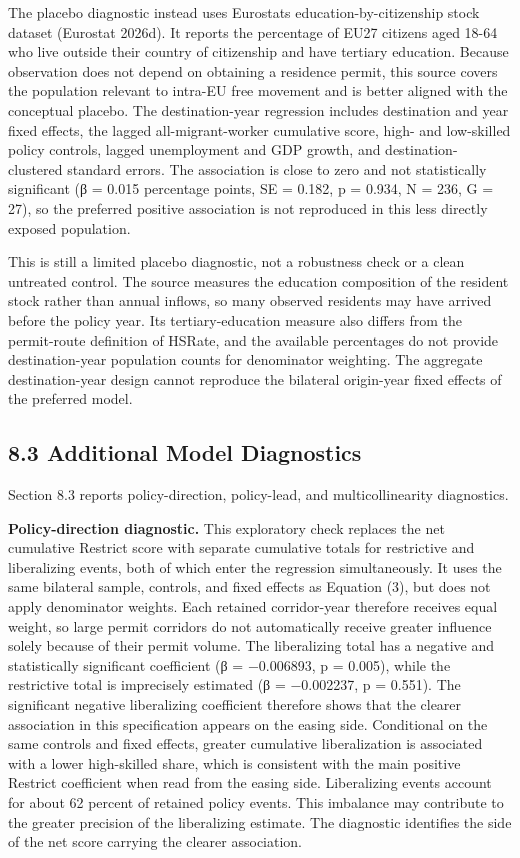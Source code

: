 \documentclass[11pt,a4paper]{article}
\begin{document}
The placebo diagnostic instead uses Eurostat\textquotesingle s
education-by-citizenship stock dataset (Eurostat 2026d). It reports the
percentage of EU27 citizens aged 18-64 who live outside their country of
citizenship and have tertiary education. Because observation does not
depend on obtaining a residence permit, this source covers the
population relevant to intra-EU free movement and is better aligned with
the conceptual placebo. The destination-year regression includes
destination and year fixed effects, the lagged all-migrant-worker
cumulative score, high- and low-skilled policy controls, lagged
unemployment and GDP growth, and destination-clustered standard errors.
The association is close to zero and not statistically significant (β =
0.015 percentage points, SE = 0.182, p = 0.934, N = 236, G = 27), so the
preferred positive association is not reproduced in this less directly
exposed population.

This is still a limited placebo diagnostic, not a robustness check or a
clean untreated control. The source measures the education composition
of the resident stock rather than annual inflows, so many observed
residents may have arrived before the policy year. Its
tertiary-education measure also differs from the permit-route definition
of HSRate, and the available percentages do not provide destination-year
population counts for denominator weighting. The aggregate
destination-year design cannot reproduce the bilateral origin-year fixed
effects of the preferred model.

\subsection{8.3 Additional Model
Diagnostics}\label{additional-model-diagnostics}

Section 8.3 reports policy-direction, policy-lead, and multicollinearity
diagnostics.

\textbf{Policy-direction diagnostic.} This exploratory check replaces the
net cumulative Restrict score with separate cumulative totals for
restrictive and liberalizing events, both of which enter the regression
simultaneously. It uses the same bilateral sample, controls, and fixed
effects as Equation (3), but does not apply denominator weights. Each
retained corridor-year therefore receives equal weight, so large permit
corridors do not automatically receive greater influence solely because
of their permit volume. The liberalizing total has a negative and
statistically significant coefficient (β = −0.006893, p = 0.005), while
the restrictive total is imprecisely estimated (β = −0.002237, p =
0.551). The significant negative liberalizing coefficient therefore
shows that the clearer association in this specification appears on the
easing side. Conditional on the same controls and fixed effects, greater
cumulative liberalization is associated with a lower high-skilled share,
which is consistent with the main positive Restrict coefficient when
read from the easing side. Liberalizing events account for about 62
percent of retained policy events. This imbalance may contribute to the
greater precision of the liberalizing estimate. The diagnostic
identifies the side of the net score carrying the clearer association.
\end{document}
